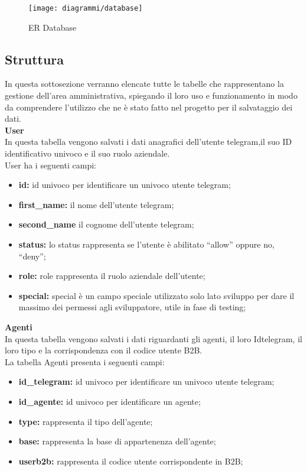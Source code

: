\begin{figure}
    \centering 
    \texttt{[image: diagrammi/database]} 
    \caption{ER Database }
\end{figure} 


\subsection{Struttura}
In questa sottosezione verranno elencate tutte le tabelle che rappresentano la gestione dell’area amministrativa, spiegando il loro uso e funzionamento in modo da comprendere l’utilizzo che ne è stato fatto nel progetto per il salvataggio dei dati. \\

\textbf{User} \\ 

In questa tabella vengono salvati i dati anagrafici dell’utente telegram,il suo ID identificativo univoco e il suo ruolo aziendale. \\

User ha i seguenti campi: \\ 
\begin{itemize}
\item \textbf{id:}  id univoco per identificare un univoco utente telegram;
\item \textbf{first\_name:} il nome dell’utente telegram;
\item \textbf{second\_name } il cognome dell’utente telegram;
\item \textbf{status:} lo status rappresenta se l’utente è abilitato “allow” oppure no, “deny”;
\item \textbf{role:} role rappresenta il ruolo aziendale dell’utente;
\item \textbf{special:} special è un campo speciale utilizzato solo lato sviluppo per dare il massimo dei  permessi agli sviluppatore, utile in fase di testing;
\end{itemize}

\textbf{Agenti}\\

In questa tabella vengono salvati i dati riguardanti gli agenti, il loro Idtelegram, il loro tipo e la corrispondenza con il codice utente B2B.\\

La tabella Agenti presenta i seguenti campi:\\

\begin{itemize}
\item \textbf{id\_telegram:}  id univoco per identificare un univoco utente telegram;
\item \textbf{id\_agente:}  id univoco per identificare un agente;
\item \textbf{type:} rappresenta il tipo dell’agente;
\item \textbf{base:} rappresenta la base di appartenenza dell’agente;
\item \textbf{userb2b:} rappresenta il codice utente corrispondente in B2B;
\end{itemize}



